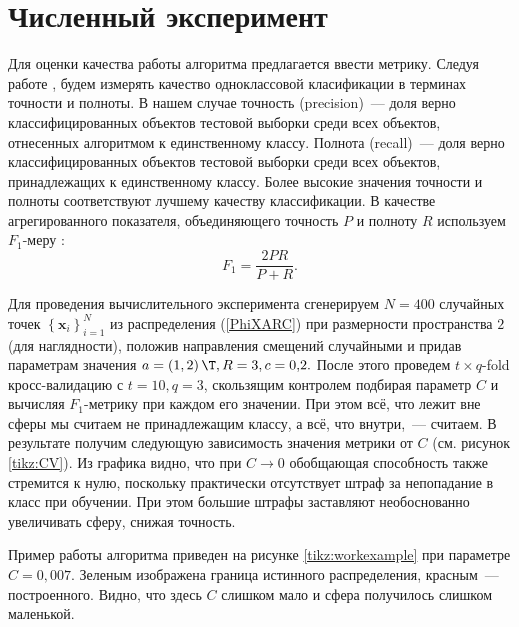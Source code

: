 \documentclass[12pt]{article}
\newcommand\mb[1]{\ensuremath{\boldsymbol{\mathbf{#1}}}}
\newcommand\cbr[1]{\left(#1\right)} %
\newcommand\fbr[1]{\left\{#1\right\}} %
\begin{document}
\section{Численный эксперимент} 		 	
	Для оценки качества работы алгоритма предлагается ввести метрику. 
	Следуя работе  \cite{Romanenko2012}, будем измерять качество одноклассовой класификации в терминах точности и полноты. 
	В нашем случае точность (precision)~--- доля верно классифицированных объектов тестовой выборки среди всех объектов, отнесенных алгоритмом к единственному классу. 
	Полнота (recall)~--- доля верно классифицированных объектов тестовой выборки среди всех объектов, принадлежащих к единственному классу. 
	Более высокие значения точности и полноты соответствуют лучшему качеству классификации. 
	В качестве агрегированного показателя, объединяющего точность $P$ и полноту $R$ используем $F_1$-меру \cite{Rijsbergen1979}:
	$$F_1 = \frac{2PR}{P+R}.$$

	Для проведения вычислительного эксперимента сгенерируем $N=400$ случайных точек $\fbr{\mb x_i}_{i=1}^N$ из распределения (\ref{PhiXARC}) при размерности пространства $2$ (для наглядности), положив направления смещений случайными и придав параметрам значения $a = \cbr{1,2}\T, R = 3, c = 0{,}2.$
	После этого проведем $t{\times}q$-fold кросс-валидацию с $t = 10, q = 3$, скользящим контролем подбирая параметр $C$ и вычисляя $F_1$-метрику при каждом его значении. При этом всё, что лежит вне сферы мы считаем не принадлежащим классу, а всё, что внутри,~--- считаем.
	В результате получим следующую зависимость значения метрики от $C$ (см. рисунок \ref{tikz:CV}).
	Из графика видно, что при $C\to 0$ обобщающая способность также стремится к нулю, поскольку практически отсутствует штраф за непопадание в класс при обучении. 
	При этом большие штрафы заставляют необоснованно увеличивать сферу, снижая точность.

	Пример работы алгоритма приведен на рисунке \ref{tikz:workexample} при параметре $C = 0{,}007.$ 
	Зеленым изображена граница истинного распределения, красным~--- построенного.
	Видно, что здесь $C$ слишком мало и сфера получилось слишком маленькой.
	
\end{document}
